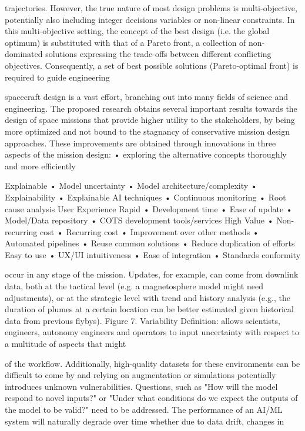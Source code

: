 \documentclass[a4paper,12pt]{article}
\begin{document}
trajectories. However, the true nature of most design problems is multi-objective,
potentially also including integer decisions variables or non-linear constraints. In
this multi-objective setting, the concept of the best design (i.e. the global optimum)
is substituted with that of a Pareto front, a collection of non-dominated solutions
expressing the trade-offs between different conﬂicting objectives. Consequently, a
set of best possible solutions (Pareto-optimal front) is required to guide engineering

spacecraft design is a vast effort, branching out into many fields of science and 
engineering. The proposed research obtains several important results towards the 
design of space missions that provide higher utility to the stakeholders, by being 
more optimized and not bound to the stagnancy of conservative mission design 
approaches. These improvements are obtained through innovations in three aspects 
of the mission design: 
• exploring the alternative concepts thoroughly and more efficiently

Explainable
• Model uncertainty
• Model architecture/complexity
• Explainability
• Explainable AI techniques
• Continuous monitoring
• Root cause analysis
User Experience
Rapid
• Development time
• Ease of update
• Model/Data repository
• COTS development tools/services
High Value
• Non-recurring cost
• Recurring cost
• Improvement over other methods
• Automated pipelines
• Reuse common solutions
• Reduce duplication of eﬀorts
Easy to use
• UX/UI intuitiveness
• Ease of integration
• Standards conformity

occur in any stage of the mission.
Updates, for example,
can come from downlink data, both at the tactical level
(e.g. a magnetosphere model might need adjustments), or
at the strategic level with trend and history analysis (e.g.,
the duration of plumes at a certain location can be better
estimated given historical data from previous ﬂybys).
Figure 7. Variability Deﬁnition: allows scientists,
engineers, autonomy engineers and operators to input
uncertainty with respect to a multitude of aspects that might

of the workﬂow. Additionally, high-quality datasets for these environments can be diﬃcult to come by and relying on
augmentation or simulations potentially introduces unknown vulnerabilities. Questions, such as "How will the model
respond to novel inputs?" or "Under what conditions do we expect the outputs of the model to be valid?" need to be
addressed. The performance of an AI/ML system will naturally degrade over time whether due to data drift, changes in
\end{document}
